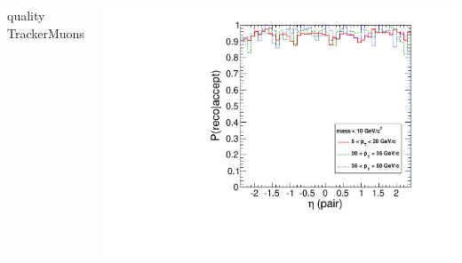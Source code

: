 \documentclass[compress]{beamer}
\begin{document}
\begin{frame}
\begin{columns}
\centering quality TrackerMuons

\includegraphics[width=\linewidth]{eta_mass10cut_TrackerMuon.pdf}
\end{columns}
\end{frame}
\end{document}
